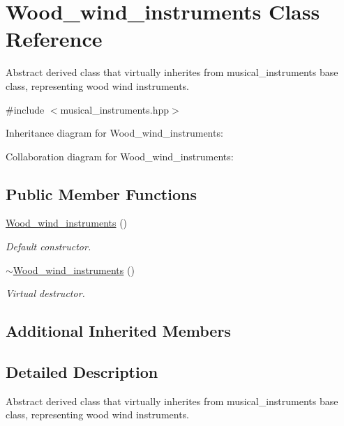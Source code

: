 \hypertarget{classWood__wind__instruments}{}\section{Wood\+\_\+wind\+\_\+instruments Class Reference}
\label{classWood__wind__instruments}


Abstract derived class that virtually inherites from musical\+\_\+instruments base class, representing wood wind instruments.  




{\ttfamily \#include $<$musical\+\_\+instruments.\+hpp$>$}



Inheritance diagram for Wood\+\_\+wind\+\_\+instruments\+:


Collaboration diagram for Wood\+\_\+wind\+\_\+instruments\+:
\subsection*{Public Member Functions}
\begin{DoxyCompactItemize}
\item 
\hyperlink{classWood__wind__instruments_a7f9bd970b85f3df00ebaf72174a1c74e}{Wood\+\_\+wind\+\_\+instruments} ()
\begin{DoxyCompactList}\small\item\em Default constructor. \end{DoxyCompactList}\item 
\hyperlink{classWood__wind__instruments_a014b10a6f99c39ccc593c0ed2a61eaa7}{$\sim$\+Wood\+\_\+wind\+\_\+instruments} ()
\begin{DoxyCompactList}\small\item\em Virtual destructor. \end{DoxyCompactList}\end{DoxyCompactItemize}
\subsection*{Additional Inherited Members}


\subsection{Detailed Description}
Abstract derived class that virtually inherites from musical\+\_\+instruments base class, representing wood wind instruments. 

